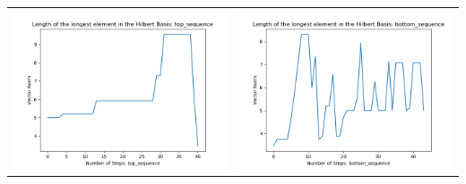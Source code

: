 \documentclass[10pt]{article}
\begin{document}
\begin{tabular}{c|c}
\begin{minipage}{.45\textwidth}
\includegraphics[width=\textwidth]{"DATA/4d/4 generators 2 bound G/top_sequence LENGTH"}
\end{minipage} &
\begin{minipage}{.45\textwidth}
\includegraphics[width=\textwidth]{"DATA/4d/4 generators 2 bound G bottomup/bottom_sequence LENGTH"}
\end{minipage}
\end{tabular}
\end{document}
